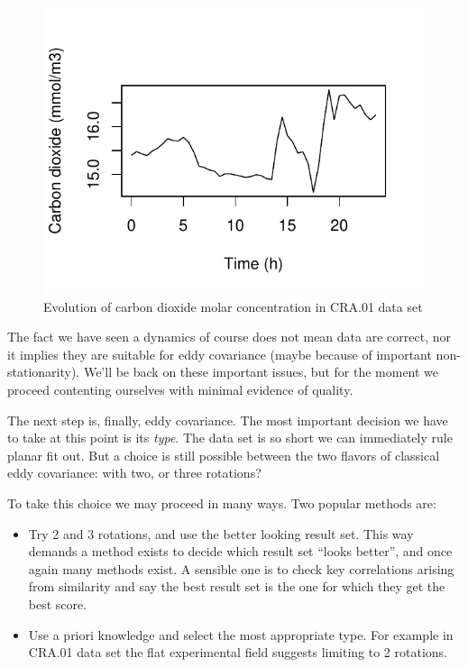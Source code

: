 \documentclass[a4paper,10pt]{book}
\begin{document}
\begin{figure}[htp]
 \centering
 \begin{center}
 \includegraphics[scale=1.1,keepaspectratio=true]{./diagrams/CRA01_C.pdf}
 \end{center}
 \caption{Evolution of carbon dioxide molar concentration in CRA.01 data set}
 \label{fig:CRA.01 C}
\end{figure}

The fact we have seen a dynamics of course does not mean data are correct, nor it implies they are suitable for eddy covariance (maybe because of important non-stationarity). We'll be back on these important issues, but for the moment we proceed contenting ourselves with minimal evidence of quality.

The next step is, finally, eddy covariance. The most important decision we have to take at this point is its \emph{type}. The data set is so short we can immediately rule planar fit out. But a choice is still possible between the two flavors of classical eddy covariance: with two, or three rotations?

To take this choice we may proceed in many ways. Two popular methods are:

\begin{itemize}
 \item Try 2 and 3 rotations, and use the better looking result set. This way demands a method exists to decide which result set ``looks better'', and once again many methods exist. A sensible one is to check key correlations arising from similarity and say the best result set is the one for which they get the best score.
 \item Use a priori knowledge and select the most appropriate type. For example in CRA.01 data set the flat experimental field suggests limiting to 2 rotations.
\end{itemize}
\end{document}

